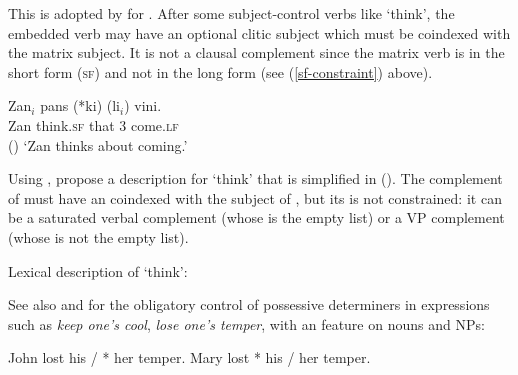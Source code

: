 This is adopted by \citet[Section~6]{HenriandLaurens2011} for .  After some
subject-control verbs like  `think', the embedded verb may have an optional clitic
subject which must be coindexed with the matrix subject.  It is not a clausal complement since the
matrix verb is in the short form (\textsc{sf}) and not in the long form (see (\ref{sf-constraint})
above).

\ea
\gll Zan$_{i}$ pans          (*ki)           (li$_{i}$)            vini.\footnotemark\\
     Zan       think.\textsc{sf} \hphantom{(*}that \hphantom{(}3\SG{} come.\textsc{lf}  \\\hfill()
\glt `Zan thinks about coming.'
\z

\noindent
Using \xarg, \citet[]{HenriandLaurens2011} propose a description for  `think' that is
simplified in (). The complement of
 must have an \xarg coindexed with the subject of , but its \subjl is not
constrained: it can be a saturated verbal complement (whose \subjv is the empty list) or a VP
complement (whose \subjv is not the empty list).

\ea
\label{ex-pans-Maritian}
Lexical description of  `think':\\
\z

\noindent
See also  and  for the obligatory control of possessive determiners in  expressions such as \emph{keep one's cool}, \emph{lose one's temper}, with an \xarg feature on nouns and NPs:
\begin{exe}
\ex \begin{xlist}
\ex John lost his / * her temper.
\ex Mary lost * his / her temper.
\end{xlist}
\end{exe}

